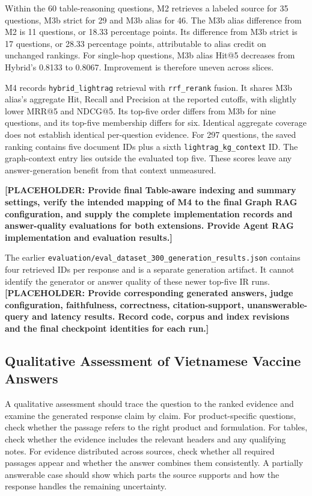 \documentclass[oneside]{sn-jnl}
\newcommand{\pending}[1]{\textbf{\textcolor{red!65!black}{[PLACEHOLDER: #1]}}}
\newcommand{\artifact}[1]{\nolinkurl{#1}}
\begin{document}
Within the 60 table-reasoning questions, M2 retrieves a labeled source for 35 questions, M3b strict for 29 and M3b alias for 46. The M3b alias difference from M2 is 11 questions, or 18.33 percentage points. Its difference from M3b strict is 17 questions, or 28.33 percentage points, attributable to alias credit on unchanged rankings. For single-hop questions, M3b alias Hit@5 decreases from Hybrid's 0.8133 to 0.8067. Improvement is therefore uneven across slices.

M4 records \artifact{hybrid_lightrag} retrieval with \artifact{rrf_rerank} fusion. It shares M3b alias's aggregate Hit, Recall and Precision at the reported cutoffs, with slightly lower MRR@5 and NDCG@5. Its top-five order differs from M3b for nine questions, and its top-five membership differs for six. Identical aggregate coverage does not establish identical per-question evidence. For 297 questions, the saved ranking contains five document IDs plus a sixth \artifact{lightrag_kg_context} ID. The graph-context entry lies outside the evaluated top five. These scores leave any answer-generation benefit from that context unmeasured.

\pending{Provide final Table-aware indexing and summary settings, verify the intended mapping of M4 to the final Graph RAG configuration, and supply the complete implementation records and answer-quality evaluations for both extensions. Provide Agent RAG implementation and evaluation results.}

The earlier \artifact{evaluation/eval_dataset_300_generation_results.json} contains four retrieved IDs per response and is a separate generation artifact. It cannot identify the generator or answer quality of these newer top-five IR runs. \pending{Provide corresponding generated answers, judge configuration, faithfulness, correctness, citation-support, unanswerable-query and latency results. Record code, corpus and index revisions and the final checkpoint identities for each run.}

\subsection{Qualitative Assessment of Vietnamese Vaccine Answers}
A qualitative assessment should trace the question to the ranked evidence and examine the generated response claim by claim. For product-specific questions, check whether the passage refers to the right product and formulation. For tables, check whether the evidence includes the relevant headers and any qualifying notes. For evidence distributed across sources, check whether all required passages appear and whether the answer combines them consistently. A partially answerable case should show which parts the source supports and how the response handles the remaining uncertainty.
\end{document}
